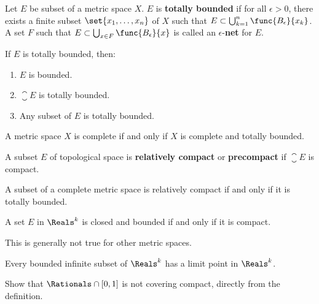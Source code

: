 \begin{definition}
    Let \(E\) be subset of a metric space \(X\). \(E\) is \textbf{totally bounded} if for all \(\epsilon > 0\),  there exists a finite subset \(\set{x_1, \dots , x_n}\) of \(X\) such that \(E \subset \bigcup_{k= 1}^n \func{B_{\epsilon}}{x_k}\). A set \(F\) such that \(E \subset  \bigcup_{x \in F} \func{B_{\epsilon}}{x}\) is called an  \(\epsilon\)-\textbf{net} for \(E\).
\end{definition}

\begin{proposition}
    If \(E\) is totally bounded, then:
    \begin{enumerate}
        \item \(E\) is bounded.
        \item \(\closure E\) is totally bounded.
        \item Any subset of \(E\) is totally bounded.
    \end{enumerate}
\end{proposition}

\begin{theorem}
    A metric space \(X\) is complete if and only if \(X\) is complete and totally bounded.
\end{theorem}

\begin{definition}
    A subset \(E\) of topological space is \textbf{relatively compact} or \textbf{precompact} if \(\closure E\) is compact.
\end{definition}

\begin{corollary}
    A subset of a complete metric space is relatively compact if and only if it is totally bounded.
\end{corollary}

\begin{theorem}
    A set \(E\) in \(\Reals^k\) is closed and bounded  if and only if it is compact.
\end{theorem}

\begin{note}
    This is generally not true for other metric spaces.
\end{note}

\begin{theorem}[Weierstrass]
    Every bounded infinite subset of \(\Reals^k\) has a limit point in \(\Reals^k\).
\end{theorem}

\begin{exercise}
    \item Show that \(\Rationals \cap [0,1]\) is not covering compact, directly from the definition.
\end{exercise}
\newpage

